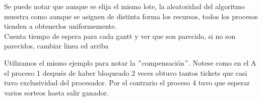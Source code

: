 Se puede notar que aunque se elija el mismo lote, la aleatoridad del algoritmo muestra como aunque se asignen de distinta forma los recursos, todos los procesos
tienden a obtenerlos uniformemente.\\

Cuenta tiempo de espera para cada gantt y ver que son parecido, si no son parecidos, cambiar linea ed arriba


Utilizamos el mismo ejemplo para notar la $"$compensación$"$. Notese como en el A el proceso 1 después de haber bloqueado 2 veces obtuvo tantos tickets que casi tuvo
exclusividad del procesador. Por el contrario el proceso 4 tuvo que esperar varios sorteos hasta salir ganador.
